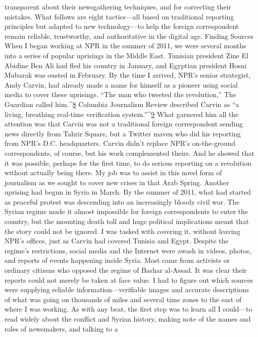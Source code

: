 transparent about their newsgathering techniques, and for correcting their mistakes.
What follows are eight tactics—all based on traditional reporting principles but adapted
to new technology—to help the foreign correspondent remain reliable, trustworthy, and
authoritative in the digital age.
Finding Sources
When I began working at NPR in the summer of 2011, we were several months into a
series of popular uprisings in the Middle East. Tunisian president Zine El Abidine Ben
Ali had fled his country in January, and Egyptian president Hosni Mubarak was ousted in
February. By the time I arrived, NPR’s senior strategist, Andy Carvin, had already made
a name for himself as a pioneer using social media to cover these uprisings. ``The man
who tweeted the revolution,'' The Guardian called him.^{\href{#endnotes}{8}} Columbia Journalism Review
described Carvin as ``a living, breathing real-time verification system.''^{\href{#endnotes}{9}}
What garnered him all the attention was that Carvin was not a traditional foreign
correspondent sending news directly from Tahrir Square, but a Twitter maven who did
his reporting from NPR’s D.C. headquarters. Carvin didn’t replace NPR’s on-the-ground
correspondents, of course, but his work complemented theirs. And he showed that it was
possible, perhaps for the first time, to do serious reporting on a revolution without
actually being there.
My job was to assist in this novel form of journalism as we sought to cover new crises in
that Arab Spring. Another uprising had begun in Syria in March. By the summer of 2011,
what had started as peaceful protest was descending into an increasingly bloody civil war.
The Syrian regime made it almost impossible for foreign correspondents to enter the
country, but the mounting death toll and huge political implications meant that the story
could not be ignored. I was tasked with covering it, without leaving NPR’s offices, just as
Carvin had covered Tunisia and Egypt.
Despite the regime’s restrictions, social media and the Internet were awash in videos,
photos, and reports of events happening inside Syria. Most came from activists or
ordinary citizens who opposed the regime of Bashar al-Assad. It was clear their reports
could not merely be taken at face value. I had to figure out which sources were supplying
reliable information—verifiable images and accurate descriptions of what was going on
thousands of miles and several time zones to the east of where I was working.
As with any beat, the first step was to learn all I could—to read widely about the conflict
and Syrian history, making note of the names and roles of newsmakers, and talking to a
